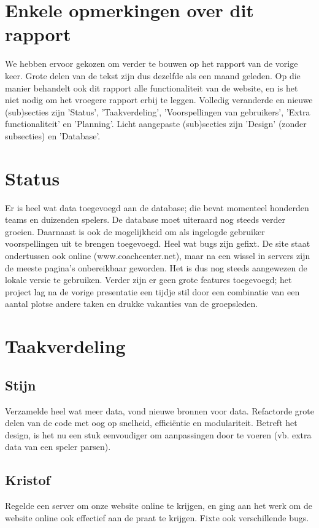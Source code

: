 \documentclass[11pt, a4paper]{article}
\begin{document}
\title{}
\author{Groep A\\ Rapport 1}
\date{19 maart 2014}
\maketitle


\section{Enkele opmerkingen over dit rapport}
We hebben ervoor gekozen om verder te bouwen op het rapport van de vorige keer. Grote delen van de tekst zijn dus dezelfde als een maand geleden. Op die manier behandelt ook dit rapport alle functionaliteit van de website, en is het niet nodig om het vroegere rapport erbij te leggen. Volledig veranderde en nieuwe (sub)secties zijn 'Status', 'Taakverdeling', 'Voorspellingen van gebruikers',  'Extra functionaliteit' en 'Planning'. Licht aangepaste (sub)secties zijn 'Design' (zonder subsecties) en 'Database'.
\section{Status}
Er is heel wat data toegevoegd aan de database; die bevat momenteel honderden teams en duizenden spelers. De database moet uiteraard nog steeds verder groeien. Daarnaast is ook de mogelijkheid om als ingelogde gebruiker voorspellingen uit te brengen toegevoegd. Heel wat bugs zijn gefixt. De site staat ondertussen ook online (www.coachcenter.net), maar na een wissel in servers zijn de meeste pagina's onbereikbaar geworden. Het is dus nog steeds aangewezen de lokale versie te gebruiken. Verder zijn er geen grote features toegevoegd; het project lag na de vorige presentatie een tijdje stil door een combinatie van een aantal plotse andere taken en drukke vakanties van de groepsleden.

\section{Taakverdeling}
\subsection{Stijn}
Verzamelde heel wat meer data, vond nieuwe bronnen voor data. Refactorde grote delen van de code met oog op snelheid, effici\"entie en modulariteit. Betreft het design, is het nu een stuk eenvoudiger om aanpassingen door te voeren (vb. extra data van een speler parsen).
\subsection{Kristof}
Regelde een server om onze website online te krijgen, en ging aan het werk om de website online ook effectief aan de praat te krijgen. Fixte ook verschillende bugs.
\end{document}
